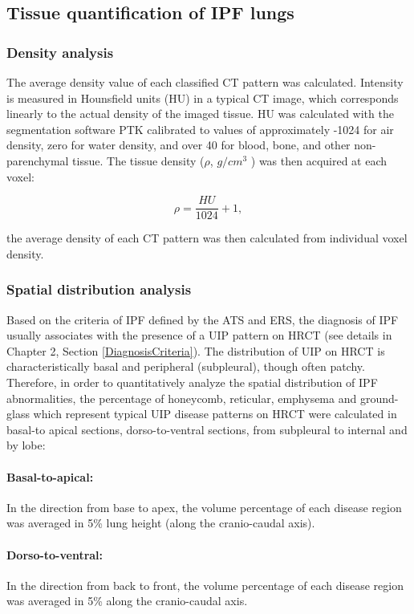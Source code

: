 \subsection{Tissue quantification of IPF lungs} \label{TissueQuantification}
\subsubsection{Density analysis}
The average density value of each classified CT pattern was calculated. Intensity is measured in Hounsfield units (HU) in a typical CT image, which corresponds linearly to the actual density of the imaged tissue. HU was calculated with the segmentation software PTK calibrated to values of approximately -1024 for air density, zero for water density, and over 40 for blood, bone, and other non-parenchymal tissue. The tissue density ($\rho$, $g/cm^3$ ) was then acquired at each voxel:

\begin{equation}
\rho = \frac{HU}{1024} + 1,
\end{equation}

\noindent the average density of each CT pattern was then calculated from individual voxel density.

\subsubsection{Spatial distribution analysis}
Based on the criteria of IPF defined by the ATS and ERS, the diagnosis of IPF usually associates with the presence of a UIP pattern on HRCT (see details in Chapter 2, Section \ref{DiagnosisCriteria}). The distribution of UIP on HRCT is characteristically basal and peripheral (subpleural), though often patchy. Therefore, in order to quantitatively analyze the spatial distribution of IPF abnormalities, the percentage of honeycomb, reticular, emphysema and ground-glass which represent typical UIP disease patterns on HRCT were calculated in basal-to apical sections, dorso-to-ventral sections, from subpleural to internal and by lobe: 

\paragraph{Basal-to-apical:} In the direction from base to apex, the volume percentage of each disease region was averaged in 5\% lung height (along the cranio-caudal axis). 

\paragraph{Dorso-to-ventral:} In the direction from back to front, the volume percentage of each disease region was averaged in 5\% along the cranio-caudal axis. 

